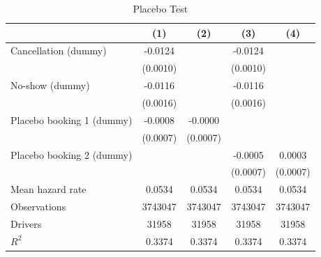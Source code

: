 \documentclass[reviewmode,AEJ]{AEA}
\begin{document}
\begin{appendices}
\begin{table}[]
    \hfill


    \centering
    \footnotesize
    \caption{Placebo Test}
    \def\sym#1{}%
    \begin{tabularx}{\textwidth}{l@{\extracolsep{\fill}}*{4}{c}} 
        \toprule
        \toprule
                            &\multicolumn{1}{c}{(1)}         &\multicolumn{1}{c}{(2)}         &\multicolumn{1}{c}{(3)}         &\multicolumn{1}{c}{(4)}         \\
        \midrule
        Cancellation (dummy)&     -0.0124\sym{***}&                     &     -0.0124\sym{***}&                     \\
                            &    (0.0010)         &                     &    (0.0010)         &                     \\
        \addlinespace
        No-show (dummy)     &     -0.0116\sym{***}&                     &     -0.0116\sym{***}&                     \\
                            &    (0.0016)         &                     &    (0.0016)         &                     \\
        \addlinespace
        Placebo booking 1 (dummy)&     -0.0008         &     -0.0000         &                     &                     \\
                            &    (0.0007)         &    (0.0007)         &                     &                     \\
        \addlinespace
        Placebo booking 2 (dummy)&                     &                     &     -0.0005         &      0.0003         \\
                            &                     &                     &    (0.0007)         &    (0.0007)         \\
        \midrule
        Mean hazard rate    &      0.0534         &      0.0534         &       0.0534        &      0.0534         \\
        Observations        &     \num{3743047}   &     \num{3743047}   &     \num{3743047}   &     \num{3743047}   \\
        Drivers             &     \num{31958}     &      \num{31958}    &       \num{31958}   &       \num{31958}         \\
        \(R^2\)             &      0.3374         &      0.3374         &      0.3374         &      0.3374         \\
        \bottomrule

\end{tabularx}
\end{table}
\end{appendices}
\end{document}
